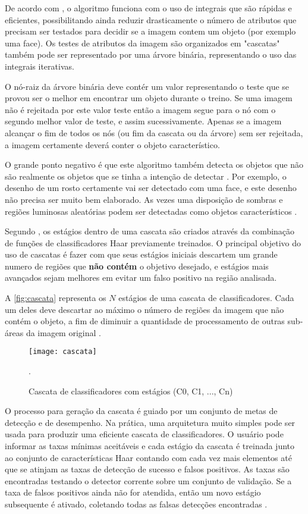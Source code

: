 De acordo com \cite{drmathew_java_programming}, o algoritmo funciona com o uso de integrais que são rápidas e eficientes, possibilitando ainda reduzir drasticamente o número de atributos que precisam ser testados para decidir se a imagem contem um objeto (por exemplo uma face). Os testes de atributos da imagem são organizados em "cascatas" também pode ser representado por uma árvore binária, representando o uso das integrais iterativas.

O nó-raiz da árvore binária deve contér um valor representando o teste que se provou ser o melhor em encontrar um objeto durante o treino. Se uma imagem não é rejeitada por este valor teste então a imagem segue para o nó com o segundo melhor valor de teste, e assim sucessivamente. Apenas se a imagem alcançar o fim de todos os nós (ou fim da cascata ou da árvore) sem ser rejeitada, a imagem certamente deverá conter o objeto característico.

O grande ponto negativo é que este algoritmo também detecta os objetos que não são realmente os objetos que se tinha a intenção de detectar \cite{drmathew_java_programming}. Por exemplo, o desenho de um rosto certamente vai ser detectado com uma face, e este desenho não precisa ser muito bem elaborado. As vezes uma disposição de sombras e regiões luminosas aleatórias podem ser detectadas como objetos característicos .

Segundo \cite{gustavo_cascata}, os estágios dentro de uma cascata são criados através da combinação de funções de classificadores Haar previamente treinados. O principal objetivo do uso de cascatas é fazer com que seus estágios iniciais descartem um grande numero de regiões que \textbf{não contém} o objetivo desejado, e estágios mais avançados sejam melhores em evitar um falso positivo na região analisada. 

A \autoref{fig:cascata} representa os $N$ estágios de uma cascata de classificadores. Cada um deles deve descartar ao máximo o número de regiões da imagem que não contém o objeto, a fim de diminuir a quantidade de processamento de outras sub-áreas da imagem original \cite{gustavo_cascata}.

 \begin{figure}[h]
	\centering
	\texttt{[image: cascata]}
	\caption{Cascata de classificadores com estágios (C0, C1, ..., Cn)}.
	\label{fig:cascata}
\end{figure}

O processo para geração da cascata é guiado por um conjunto de metas de detecção e de desempenho. Na prática, uma arquitetura muito simples pode ser usada para produzir uma eficiente cascata de classificadores. O usuário pode informar as taxas mínimas aceitáveis e cada estágio da cascata é treinada junto ao conjunto de características Haar contando com cada vez mais elementos até que se atinjam as taxas de detecção de sucesso e falsos positivos. As taxas são encontradas testando o detector corrente sobre um conjunto de validação. Se a taxa de falsos positivos ainda não for atendida, então um novo estágio subsequente é ativado, coletando todas as falsas detecções encontradas \cite{gustavo_cascata}.


